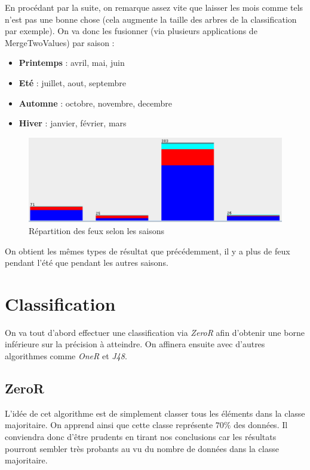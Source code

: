\documentclass{article}
\begin{document}
\begin{sffamily}
En procédant par la suite, on remarque assez vite que laisser les mois comme tels n'est pas une bonne chose (cela augmente la 
taille des arbres de la classification par exemple). On va donc les fusionner (via plusieurs applications de MergeTwoValues) par 
saison :
\begin{itemize}
\item \textbf{Printemps} : avril, mai, juin
\item \textbf{Eté} : juillet, aout, septembre
\item \textbf{Automne} : octobre, novembre, decembre
\item \textbf{Hiver} : janvier, février, mars
\end{itemize}

\begin{figure}[h!]
    \begin{center}
    \includegraphics[scale=0.5]{img_003.pdf}
    \caption{Répartition des feux selon les saisons}
    \end{center}	
\end{figure}

On obtient les mêmes types de résultat que précédemment, il y a plus de feux pendant l'été que pendant les autres saisons.

\newpage

\section{Classification}

On va tout d'abord effectuer une classification via \textit{ZeroR} afin d'obtenir une borne inférieure sur la précision à 
atteindre. On affinera ensuite avec d'autres algorithmes comme \textit{OneR} et \textit{J48}.

\subsection*{ZeroR}

L'idée de cet algorithme est de simplement classer tous les éléments dans la classe majoritaire. On apprend ainsi que cette 
classe représente $70 \%$ des données. Il conviendra donc d'être prudents en tirant nos conclusions car les résultats pourront 
sembler très probants au vu du nombre de données dans la classe majoritaire.\\


\end{sffamily}
\end{document}
